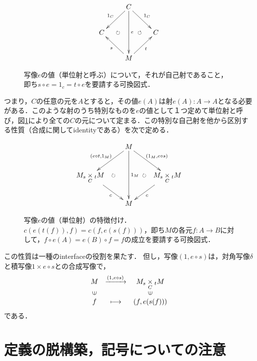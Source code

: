 \documentclass[uplatex, dvipdfmx]{jsreport}
\begin{document}
\begin{figure}[h]
    \[
    \xymatrix{
        &C\ar[dl]_-{1_C}\ar[dr]^-{1_C}\ar[dd]^-e&\\
    C\ar@{}[rr]|(.3)\circlearrowright|(.7)\circlearrowleft&&C\\
        &M\ar[ul]^-s\ar[ur]_-t&\\
    }
    \]
    \caption{写像$e$の値（単位射と呼ぶ）について，それが自己射であること，即ち$s\circ e=1_c=t\circ e$を要請する可換図式．}\label{def-cd:3}
\end{figure}
つまり，$C$の任意の元を$A$とすると，その値$e(A)$は射$e(A):A\rightarrow A$となる必要がある．このような射のうち特別なものを$e$の値として１つ定めて単位射と呼び，図\ref{def-cd:3}により全ての$C$の元について定まる．この特別な自己射を他から区別する性質（合成に関して\textrm{identity}である）を次で定める．

\begin{figure}[h]
    \[
    \xymatrix{
        &M\ar[dl]_-{(e\circ t,1_M)}\ar[dr]^-{(1_M,e\circ s)}\ar[dd]^-{1_M}&\\
    {M_s\underset{C}{\times}{}_tM}\ar[dr]_-c\ar@{}[rr]|(0.3)\circlearrowright|(0.7)\circlearrowright&&{M_s\underset{C}{\times}{}_tM}\ar[dl]^-{c}\\
        &M&\\
    }
    \]
    \caption{写像$e$の値（単位射）の特徴付け．$c(e(t(f)),f)=c(f,e(s(f)))$，即ち$M$の各元$f:A\to B$に対して，$f\circ e(A)=e(B)\circ f=f$の成立を要請する可換図式．}\label{def-cd:4}
\end{figure}
この性質は一種のinterfaceの役割を果たす．
但し，写像$(1,e\circ s)$は，対角写像$\delta$と積写像$1\times e\circ s$との合成写像で，
\[\begin{array}{ccc}
    M & \xrightarrow{(1,e\circ s)} & M_s \underset{C}{\times}{}_tM\\
    \rotatebox{90}{$\in$} & & \rotatebox{90}{$\in$}\\
    f & \longmapsto & (f,e(s(f)))
\end{array}\]
である．

\section{定義の脱構築，記号についての注意}
\end{document}
